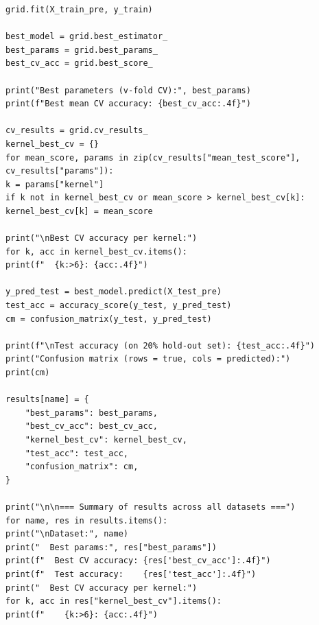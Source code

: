 \documentclass[11pt]{article}
\begin{document}
\begin{lstlisting}[style=matlabstyle]
grid.fit(X_train_pre, y_train)

best_model = grid.best_estimator_
best_params = grid.best_params_
best_cv_acc = grid.best_score_

print("Best parameters (v-fold CV):", best_params)
print(f"Best mean CV accuracy: {best_cv_acc:.4f}")

cv_results = grid.cv_results_
kernel_best_cv = {}
for mean_score, params in zip(cv_results["mean_test_score"], cv_results["params"]):
k = params["kernel"]
if k not in kernel_best_cv or mean_score > kernel_best_cv[k]:
kernel_best_cv[k] = mean_score

print("\nBest CV accuracy per kernel:")
for k, acc in kernel_best_cv.items():
print(f"  {k:>6}: {acc:.4f}")

y_pred_test = best_model.predict(X_test_pre)
test_acc = accuracy_score(y_test, y_pred_test)
cm = confusion_matrix(y_test, y_pred_test)

print(f"\nTest accuracy (on 20% hold-out set): {test_acc:.4f}")
print("Confusion matrix (rows = true, cols = predicted):")
print(cm)

results[name] = {
	"best_params": best_params,
	"best_cv_acc": best_cv_acc,
	"kernel_best_cv": kernel_best_cv,
	"test_acc": test_acc,
	"confusion_matrix": cm,
}

print("\n\n=== Summary of results across all datasets ===")
for name, res in results.items():
print("\nDataset:", name)
print("  Best params:", res["best_params"])
print(f"  Best CV accuracy: {res['best_cv_acc']:.4f}")
print(f"  Test accuracy:    {res['test_acc']:.4f}")
print("  Best CV accuracy per kernel:")
for k, acc in res["kernel_best_cv"].items():
print(f"    {k:>6}: {acc:.4f}")
	\end{lstlisting}
\end{document}
